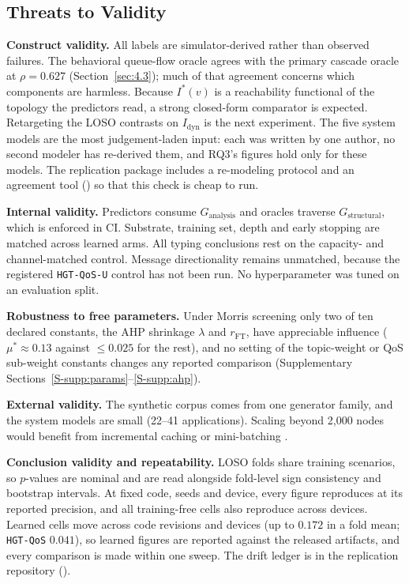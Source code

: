 \documentclass[preprint,3p]{elsarticle}
\begin{document}
\subsection{Threats to Validity}
\label{sec:threats}

\noindent\textbf{Construct validity.} All labels are simulator-derived rather than observed failures. The behavioral queue-flow oracle agrees with the primary cascade oracle at $\rho = 0.627$ (Section~\ref{sec:4.3}); much of that agreement concerns which components are harmless. Because $I^*(v)$ is a reachability functional of the topology the predictors read, a strong closed-form comparator is expected. Retargeting the LOSO contrasts on $I_{\text{dyn}}$ is the next experiment. The five system models are the most judgement-laden input: each was written by one author, no second modeler has re-derived them, and RQ3's figures hold only for these models. The replication package includes a re-modeling protocol and an agreement tool () so that this check is cheap to run.

\noindent\textbf{Internal validity.} Predictors consume $G_{\text{analysis}}$ and oracles traverse $G_{\text{structural}}$, which is enforced in CI. Substrate, training set, depth and early stopping are matched across learned arms. All typing conclusions rest on the capacity- and channel-matched control. Message directionality remains unmatched, because the registered \texttt{HGT-QoS-U} control has not been run. No hyperparameter was tuned on an evaluation split.

\noindent\textbf{Robustness to free parameters.} Under Morris screening only two of ten declared constants, the AHP shrinkage $\lambda$ and $r_{\text{FT}}$, have appreciable influence ($\mu^* \approx 0.13$ against $\le 0.025$ for the rest), and no setting of the topic-weight or QoS sub-weight constants changes any reported comparison (Supplementary Sections~\ref{S-supp:params}--\ref{S-supp:ahp}).

\noindent\textbf{External validity.} The synthetic corpus comes from one generator family, and the system models are small (22--41 applications). Scaling beyond 2,000 nodes would benefit from incremental caching or mini-batching \cite{zeng2020graphsaint}.

\noindent\textbf{Conclusion validity and repeatability.} LOSO folds share training scenarios, so $p$-values are nominal \cite{nadeau2003inference} and are read alongside fold-level sign consistency and bootstrap intervals. At fixed code, seeds and device, every figure reproduces at its reported precision, and all training-free cells also reproduce across devices. Learned cells move across code revisions and devices (up to $0.172$ in a fold mean; \texttt{HGT-QoS} $0.041$), so learned figures are reported against the released artifacts, and every comparison is made within one sweep. The drift ledger is in the replication repository ().
\end{document}
